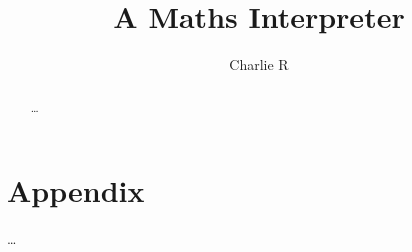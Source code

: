 \documentclass[titlepage]{report}
\title{\textbf{\huge{A Maths Interpreter}}\\ \ccbyncsa}
\author{Charlie R}
\begin{document}
    \maketitle


    \tableofcontents

    \begin{abstract}
        \ldots
    \end{abstract}

    \newpage{}\setcounter{page}{1}

    
    
    
    

    \newpage{}\setcounter{page}{1}
    
    \printbibliography

    \chapter{Appendix}
        \ldots
\end{document}
